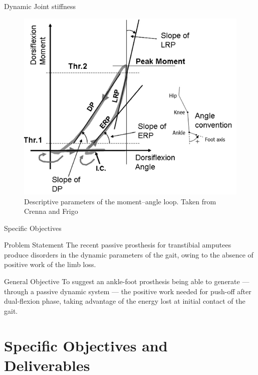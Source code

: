 \documentclass[10pt]{beamer}
\begin{document}
\begin{frame}[fragile]{Dynamic Joint stiffness}
\begin{figure}[h]
\begin{center}
\includegraphics[scale=0.3]{slopesphases.png}
\caption{Descriptive parameters of the moment–angle loop. Taken from Crenna and Frigo\cite{Crenna2011}}
\end{center}
\end{figure}
\end{frame}

\begin{frame}[fragile]{Specific Objectives}

\begin{alertblock}{Problem Statement} 
The recent passive prosthesis for transtibial amputees produce disorders in the dynamic parameters of the gait, owing to the absence of positive work of the limb loss.
\end{alertblock}


\begin{alertblock}{General Objective} 
To suggest an ankle-foot prosthesis being able to generate --- through a passive dynamic system --- the positive work needed for push-off after dual-flexion phase, taking advantage of the energy lost at initial contact of the gait.
\end{alertblock}

\end{frame}

\section{Specific Objectives and Deliverables}
\end{document}
